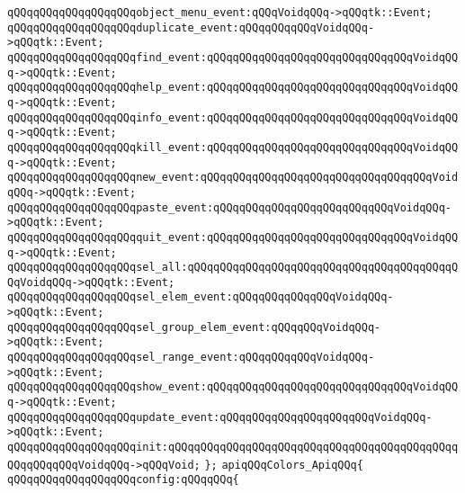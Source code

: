 \verb|qQQqqQQqqQQqqQQqqQQqobject_menu_event:qQQqVoidqQQq->qQQqtk::Event;|\newline
\newline
\verb|qQQqqQQqqQQqqQQqqQQqduplicate_event:qQQqqQQqqQQqVoidqQQq->qQQqtk::Event;|\newline
\verb|qQQqqQQqqQQqqQQqqQQqfind_event:qQQqqQQqqQQqqQQqqQQqqQQqqQQqqQQqVoidqQQq->qQQqtk::Event;|\newline
\verb|qQQqqQQqqQQqqQQqqQQqhelp_event:qQQqqQQqqQQqqQQqqQQqqQQqqQQqqQQqVoidqQQq->qQQqtk::Event;|\newline
\verb|qQQqqQQqqQQqqQQqqQQqinfo_event:qQQqqQQqqQQqqQQqqQQqqQQqqQQqqQQqVoidqQQq->qQQqtk::Event;|\newline
\verb|qQQqqQQqqQQqqQQqqQQqkill_event:qQQqqQQqqQQqqQQqqQQqqQQqqQQqqQQqVoidqQQq->qQQqtk::Event;|\newline
\verb|qQQqqQQqqQQqqQQqqQQqnew_event:qQQqqQQqqQQqqQQqqQQqqQQqqQQqqQQqqQQqVoidqQQq->qQQqtk::Event;|\newline
\verb|qQQqqQQqqQQqqQQqqQQqpaste_event:qQQqqQQqqQQqqQQqqQQqqQQqqQQqVoidqQQq->qQQqtk::Event;|\newline
\verb|qQQqqQQqqQQqqQQqqQQqquit_event:qQQqqQQqqQQqqQQqqQQqqQQqqQQqqQQqVoidqQQq->qQQqtk::Event;|\newline
\verb|qQQqqQQqqQQqqQQqqQQqsel_all:qQQqqQQqqQQqqQQqqQQqqQQqqQQqqQQqqQQqqQQqqQQqVoidqQQq->qQQqtk::Event;|\newline
\verb|qQQqqQQqqQQqqQQqqQQqsel_elem_event:qQQqqQQqqQQqqQQqVoidqQQq->qQQqtk::Event;|\newline
\verb|qQQqqQQqqQQqqQQqqQQqsel_group_elem_event:qQQqqQQqVoidqQQq->qQQqtk::Event;|\newline
\verb|qQQqqQQqqQQqqQQqqQQqsel_range_event:qQQqqQQqqQQqVoidqQQq->qQQqtk::Event;|\newline
\verb|qQQqqQQqqQQqqQQqqQQqshow_event:qQQqqQQqqQQqqQQqqQQqqQQqqQQqqQQqVoidqQQq->qQQqtk::Event;|\newline
\verb|qQQqqQQqqQQqqQQqqQQqupdate_event:qQQqqQQqqQQqqQQqqQQqqQQqVoidqQQq->qQQqtk::Event;|\newline
\newline
\verb|qQQqqQQqqQQqqQQqqQQqinit:qQQqqQQqqQQqqQQqqQQqqQQqqQQqqQQqqQQqqQQqqQQqqQQqqQQqqQQqVoidqQQq->qQQqVoid;|\newline
\verb|};|\newline
\newline
\verb|apiqQQqColors_ApiqQQq{|\newline
\newline
\verb|qQQqqQQqqQQqqQQqqQQqconfig:qQQqqQQq{|\newline
